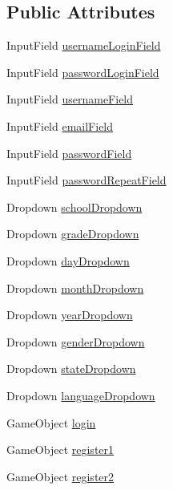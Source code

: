 \subsection*{Public Attributes}
\begin{DoxyCompactItemize}
\item 
Input\+Field \hyperlink{classRegisterController_a45cc611f9b86972779c97016a496484e}{username\+Login\+Field}
\item 
Input\+Field \hyperlink{classRegisterController_afb2904227cec3d91f80316b563c2a4d3}{password\+Login\+Field}
\item 
Input\+Field \hyperlink{classRegisterController_a47e25a3708c32d2610d8ca0db7ca51ee}{username\+Field}
\item 
Input\+Field \hyperlink{classRegisterController_a9c39e08fb93964af5d5c3c30783fa8e6}{email\+Field}
\item 
Input\+Field \hyperlink{classRegisterController_a04e4d5a4f7a00b7afeb62175455b8688}{password\+Field}
\item 
Input\+Field \hyperlink{classRegisterController_a057245e171c45f52cee78f343e7fc60c}{password\+Repeat\+Field}
\item 
Dropdown \hyperlink{classRegisterController_aa0ca4dba13add88d0bb74296ef75901c}{school\+Dropdown}
\item 
Dropdown \hyperlink{classRegisterController_af1f1c189c7974e628dd5f728a28409b6}{grade\+Dropdown}
\item 
Dropdown \hyperlink{classRegisterController_a15a9c2e4a4af0a04ded3f896eafc79a1}{day\+Dropdown}
\item 
Dropdown \hyperlink{classRegisterController_aa7fc852727ec7fc43ffe8ca7f842aee2}{month\+Dropdown}
\item 
Dropdown \hyperlink{classRegisterController_a3d0d5c6827a821305a047ac365a46fd0}{year\+Dropdown}
\item 
Dropdown \hyperlink{classRegisterController_a194e288ec2513ca13448895f95e862f9}{gender\+Dropdown}
\item 
Dropdown \hyperlink{classRegisterController_af0176c009d5aa3b397b0029473b522e9}{state\+Dropdown}
\item 
Dropdown \hyperlink{classRegisterController_a07e91bda695dab82c74e8d79ecb65f91}{language\+Dropdown}
\item 
Game\+Object \hyperlink{classRegisterController_ac81ca9cc151ce7c892f133ca5270bcb4}{login}
\item 
Game\+Object \hyperlink{classRegisterController_a8aec5b029845d59b39988246a018af8c}{register1}
\item 
Game\+Object \hyperlink{classRegisterController_a8372a097a730f83fce93fbae7531aeb5}{register2}
\end{DoxyCompactItemize}


